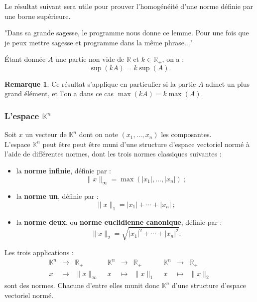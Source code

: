 \documentclass[french]{article}
\newcommand{\R}{\mathbb{R}}
\newcommand{\K}{\mathbb{K}}
\theoremstyle{plain}
\theoremstyle{definition}
\newtheorem*{rmq}{Remarque}
\theoremstyle{remark}
\begin{document}
Le résultat suivant sera utile pour prouver l'homogénéité d'une norme définie par une borne supérieure.

"Dans sa grande sagesse, le programme nous donne ce lemme. Pour une fois que je peux mettre sagesse et programme dans la même phrase..."

\begin{lem}%
	Étant donnée $A$ une partie non vide de $\R$ et $k\in\R_+$, on a : $$\sup(kA)=k\sup(A).$$
\end{lem}

\begin{rmq}
	Ce résultat s'applique en particulier si la partie $A$ admet un plus grand élément, et l'on a dans ce cas $\max(kA)=k\max(A)$.
\end{rmq}

\subsubsection*{L'espace $\K^n$}

Soit $x$ un vecteur de $\K^n$ dont on note $(x_1,\ldots,x_n)$ les composantes. \\
L'espace $\K^n$ peut être peut être muni d'une structure d'espace vectoriel normé à l'aide de différentes normes, dont les trois normes classiques suivantes :
\begin{itemize}
	\item la \textbf{norme infinie}, définie par : $$\lVert x\rVert_\infty=\max(\lvert x_1\rvert,\ldots,\lvert x_n\rvert)\ ;$$
	\item la \textbf{norme un}, définie par : $$\lVert x\rVert_1=\lvert x_1\rvert+\cdots+\lvert x_n\rvert\ ;$$
	\item la \textbf{norme deux}, ou \textbf{norme euclidienne canonique}, définie par : $$\lVert x\rVert_2=\sqrt{\lvert x_1\rvert^2+\cdots+\lvert x_n\rvert^2}.$$
\end{itemize}

\begin{prop}
	Les trois applications :
	$$\begin{array}{rcl}
		\K^n&\longrightarrow&\R_+\\
		x&\longmapsto&\lVert x\rVert_\infty
	\end{array}\ \
	\begin{array}{rcl}
		\K^n&\longrightarrow&\R_+\\
		x&\longmapsto&\lVert x\rVert_1
	\end{array}\ \
	\begin{array}{rcl}
		\K^n&\longrightarrow&\R_+\\
		x&\longmapsto&\lVert x\rVert_2
	\end{array}$$ sont des normes. Chacune d'entre elles munit donc $\K^n$ d'une structure d'espace vectoriel normé.
\end{prop}
\end{document}

